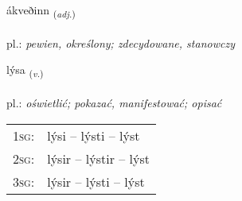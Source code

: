 \documentclass[frontgrid, backgrid]{flacards}\usepackage[]{graphicx}\usepackage[]{xcolor}
\begin{document}
\renewcommand{\flhead}{\vskip5pt \fboxsep=0pt {\small\bfseries\footnotesize Lýsingarorð | Adjective}}
\renewcommand{\fcfoot}{\vskip5pt \fboxsep=0pt \hspace{2pt}{\small\bfseries\footnotesize 1K}}

\renewcommand{\blhead}{\vskip5pt {\small\bfseries\footnotesize Lýsingarorð | Adjective }}
\renewcommand{\bcfoot}{\vskip5pt \hspace{2pt}{\small\bfseries\footnotesize 1K}}


{ákveðinn \small{\textsubscript{(\textit{adj.})}} \\[1ex] %
\textphonetic{[auːkʰvɛðɪn]} \\
pl.: \emph{pewien, określony; zdecydowane, stanowczy} \\  [2ex]
\renewcommand*{\arraystretch}{0.8}
}

\renewcommand{\flhead}{\vskip5pt \fboxsep=0pt {\small\bfseries\footnotesize Sagnorð | Verb}}
\renewcommand{\fcfoot}{\vskip5pt \fboxsep=0pt \hspace{2pt}{\small\bfseries\footnotesize 1K}}

\renewcommand{\blhead}{\vskip5pt {\small\bfseries\footnotesize Sagnorð | Verb }}
\renewcommand{\bcfoot}{\vskip5pt \hspace{2pt}{\small\bfseries\footnotesize 1K}}


{lýsa \small{\textsubscript{(\textit{v.})}} \\[1ex] %
\textphonetic{[liːsa]} \\
pl.: \emph{oświetlić; pokazać, manifestować; opisać} \\  [2ex]
\renewcommand*{\arraystretch}{0.8}
\begin{tabular}{p{1cm}l}
\textsc{1sg}: & lýsi -- lýsti -- lýst \\ 
\textsc{2sg}: & lýsir -- lýstir -- lýst \\ 
\textsc{3sg}: & lýsir -- lýsti -- lýst \\ 
\end{tabular}
}
\end{document}
